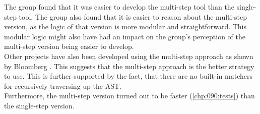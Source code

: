 The group found that it was easier to develop the multi-step tool than the single-step tool.
The group also found that it is easier to reason about the multi-step version, as the logic of that version is more modular and straightforward. 
This modular logic might also have had an impact on the group's perception of the multi-step version being easier to develop.\\
Other projects have also been developed using the multi-step approach as shown by Bloomberg \cite{bloombergClangmetatoolFrameworkReusing2023}. This suggests that the multi-step approach is the better strategy to use. This is further supported by the fact, that there are no built-in matchers for recursively traversing up the AST. \\
Furthermore, the multi-step version turned out to be faster (\cref{chp:090:tests}) than the single-step version.
